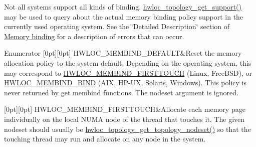 Not all systems support all kinds of binding. \hyperlink{a00193_gab8c76173c4a8ce1a9a9366012b1388e6}{hwloc\+\_\+topology\+\_\+get\+\_\+support()} may be used to query about the actual memory binding policy support in the currently used operating system. See the \char`\"{}\+Detailed Description\char`\"{} section of \hyperlink{a00191}{Memory binding} for a description of errors that can occur. \begin{DoxyEnumFields}{Enumerator}
[0pt][0pt]{}\mbox{\label{a00191_ggac9764f79505775d06407b40f5e4661e8a18675bb80ebc1bce5b652e9de8f3998c}} 
H\+W\+L\+O\+C\+\_\+\+M\+E\+M\+B\+I\+N\+D\+\_\+\+D\+E\+F\+A\+U\+LT&Reset the memory allocation policy to the system default. Depending on the operating system, this may correspond to \hyperlink{a00191_ggac9764f79505775d06407b40f5e4661e8a979c7aa78dd32780858f30f47a72cca0}{H\+W\+L\+O\+C\+\_\+\+M\+E\+M\+B\+I\+N\+D\+\_\+\+F\+I\+R\+S\+T\+T\+O\+U\+CH} (Linux, Free\+B\+SD), or \hyperlink{a00191_ggac9764f79505775d06407b40f5e4661e8ad811fa4b2a6002c4d63695a408ffde2c}{H\+W\+L\+O\+C\+\_\+\+M\+E\+M\+B\+I\+N\+D\+\_\+\+B\+I\+ND} (A\+IX, H\+P-\/\+UX, Solaris, Windows). This policy is never returned by get membind functions. The nodeset argument is ignored. \\
\hline

[0pt][0pt]{}\mbox{\label{a00191_ggac9764f79505775d06407b40f5e4661e8a979c7aa78dd32780858f30f47a72cca0}} 
H\+W\+L\+O\+C\+\_\+\+M\+E\+M\+B\+I\+N\+D\+\_\+\+F\+I\+R\+S\+T\+T\+O\+U\+CH&Allocate each memory page individually on the local N\+U\+MA node of the thread that touches it. The given nodeset should usually be \hyperlink{a00202_ga3fd37303e99ace8b0d0ea03f95f8c514}{hwloc\+\_\+topology\+\_\+get\+\_\+topology\+\_\+nodeset()} so that the touching thread may run and allocate on any node in the system.


\end{DoxyEnumFields}
